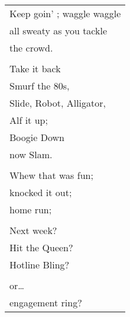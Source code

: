\documentclass{article}
\begin{document}
\begin{center}
\begin{tabular}{l}
Keep goin' ; waggle waggle \\
all sweaty as you tackle \\
the crowd. \\
\\
Take it back \\
Smurf the 80s, \\
Slide, Robot, Alligator, \\
Alf it up; \\
Boogie Down \\
now Slam. \\
\\
Whew that was fun; \\
knocked it out; \\
home run; \\
\\
Next week? \\
Hit the Queen? \\
Hotline Bling? \\
\\
or\ldots{} \\
engagement ring? \\
\end{tabular}
\end{center}
\end{document}
